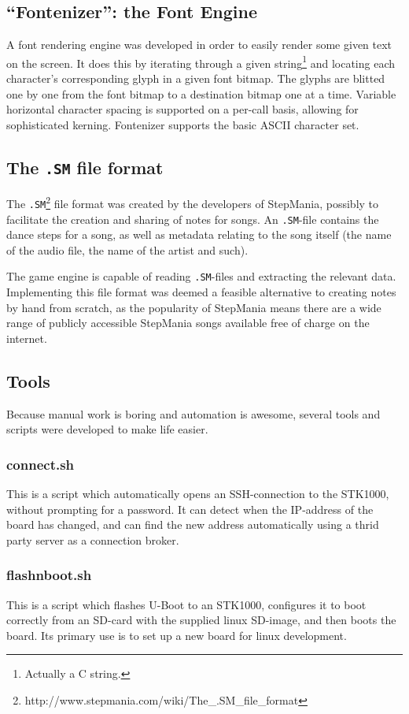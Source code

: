 \subsection{``Fontenizer'': the Font Engine}
	A font rendering engine was developed in order to easily render some given text on the screen.
	It does this by iterating through a given string\footnote{Actually a C string.} and locating each character's corresponding glyph in a given font bitmap.
	The glyphs are blitted one by one from the font bitmap to a destination bitmap one at a time.
    Variable horizontal character spacing is supported on a per-call basis, allowing for sophisticated kerning.
    Fontenizer supports the basic ASCII character set.
        
\subsection{The \texttt{.SM} file format}
The \texttt{.SM}\footnote{http://www.stepmania.com/wiki/The_.SM_file_format} file format was created by the developers of StepMania, possibly to facilitate the creation and sharing of notes for songs.
An \texttt{.SM}-file contains the dance steps for a song, as well as metadata relating to the song itself (the name of the audio file, the name of the artist and such).

The game engine is capable of reading \texttt{.SM}-files and extracting the relevant data.
Implementing this file format was deemed a feasible alternative to creating notes by hand from scratch, as the popularity of StepMania means there are a wide range of publicly accessible StepMania songs available free of charge on the internet.

\subsection{Tools}

Because manual work is boring and automation is awesome, several tools and scripts were developed to make life easier.
\subsubsection{connect.sh}
This is a script which automatically opens an SSH-connection to the STK1000, without prompting for a password. It can detect when the IP-address of the board has changed, and can find the new address automatically using a thrid party server as a connection broker.

\subsubsection{flashnboot.sh}
This is a script which flashes U-Boot to an STK1000, configures it to boot correctly from an SD-card with the supplied linux SD-image, and then boots the board.
Its primary use is to set up a new board for linux development.

